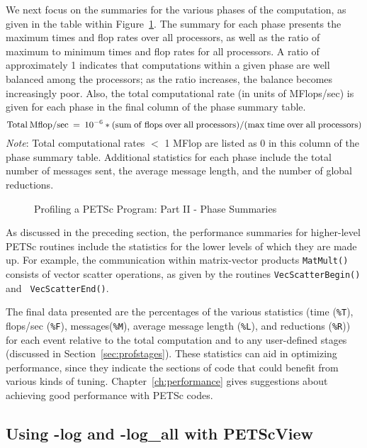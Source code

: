 {We next focus on the summaries for the various phases of the
computation, as given in the table within Figure~\ref{fig:exparprof2}.  The summary for
each phase presents the maximum times and flop rates over all
processors, as well as the ratio of maximum to minimum times and flop
rates for all processors.  A ratio of approximately 1 indicates that
computations within a given phase are well balanced among the
processors; as the ratio increases, the balance becomes increasingly
poor.  Also, the total computational rate (in units of MFlops/sec) is
given for each phase in the final column of the phase summary table.
\[
   {\rm Total\: Mflop/sec} \:=\: 10^{-6} * ({\rm sum\; of\; flops\; over\; all\; processors})/({\rm max\; time\; over\; all\; processors})
\]
{\em Note}: Total computational rates $<$ 1 MFlop are listed as 0 in this column
of the phase summary table.
Additional statistics for each phase include the total number of messages sent,
the average message length, and the number of global reductions.

\begin{figure}[tb]
\centerline{}
\vspace{-2.5in}
\caption{Profiling a PETSc Program: Part II - Phase Summaries}
\label{fig:exparprof2}
\end{figure}

As discussed in the preceding section, the performance summaries for
higher-level PETSc routines include the statistics for the lower
levels of which they are made up.  For example, the communication within
matrix-vector products {\tt MatMult()} consists of vector scatter
operations, as given by the routines {\tt VecScatterBegin()} and {\tt
VecScatterEnd()}. 
%
%

The final data presented are the percentages of the various statistics
(time ({\tt \%T}), flops/sec ({\tt \%F}), messages({\tt \%M}), average message length ({\tt \%L}),
and reductions ({\tt \%R})) for each event relative to the total computation and to any
user-defined stages (discussed in Section~\ref{sec:profstages}).
These statistics can aid in optimizing performance, since they indicate the sections of code that
could benefit from various kinds of tuning.  Chapter~\ref{ch:performance} gives
suggestions about achieving good performance with PETSc codes.

\subsection{Using -log and -log\_all with PETScView}
 

}
